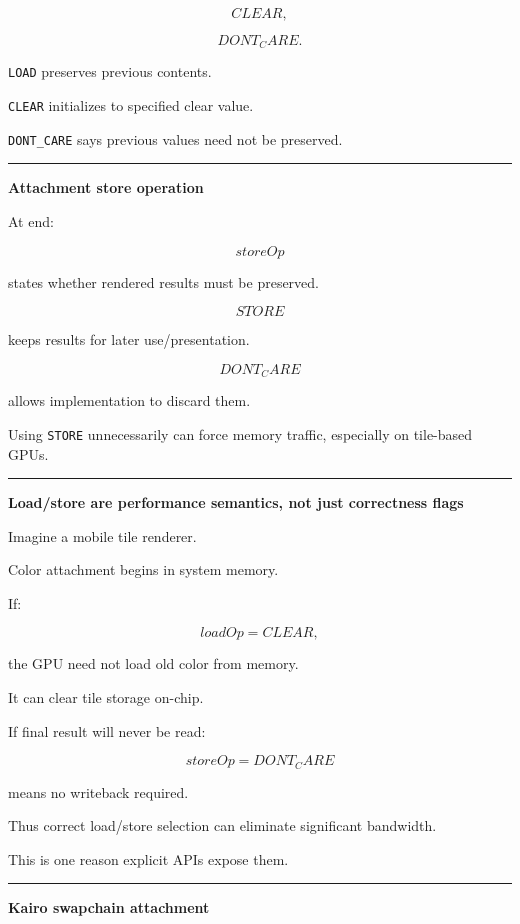 \[
CLEAR,
\]

\[
DONT_CARE.
\]

\texttt{LOAD} preserves previous contents.

\texttt{CLEAR} initializes to specified clear value.

\texttt{DONT\_CARE} says previous values need not be preserved.

\begin{center}\rule{0.5\linewidth}{0.5pt}\end{center}

\textbf{Attachment store operation}

At end:

\[
storeOp
\]

states whether rendered results must be preserved.

\[
STORE
\]

keeps results for later use/presentation.

\[
DONT_CARE
\]

allows implementation to discard them.

Using \texttt{STORE} unnecessarily can force memory traffic, especially on tile-based GPUs.

\begin{center}\rule{0.5\linewidth}{0.5pt}\end{center}

\textbf{Load/store are performance semantics, not just correctness flags}

Imagine a mobile tile renderer.

Color attachment begins in system memory.

If:

\[
loadOp=CLEAR,
\]

the GPU need not load old color from memory.

It can clear tile storage on-chip.

If final result will never be read:

\[
storeOp=DONT_CARE
\]

means no writeback required.

Thus correct load/store selection can eliminate significant bandwidth.

This is one reason explicit APIs expose them.

\begin{center}\rule{0.5\linewidth}{0.5pt}\end{center}

\textbf{Kairo swapchain attachment}


